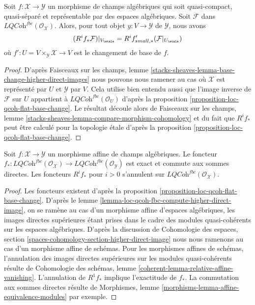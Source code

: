 \begin{lemma}
\label{lemma-loc-qcoh-fbc-compute-higher-direct-image}
Soit $f : \mathcal{X} \to \mathcal{Y}$ un morphisme de champs algébriques
qui soit quasi-compact, quasi-séparé et
représentable par des espaces algébriques. Soit $\mathcal{F}$ dans
$\textit{LQCoh}^{fbc}(\mathcal{O}_\mathcal{X})$.
Alors, pour tout objet $y : V \to \mathcal{Y}$ de $\mathcal{Y}$, nous avons
$$
(R^if_*\mathcal{F})|_{V_\etale} = R^if'_{small, *}(\mathcal{F}|_{U_\etale})
$$
où $f' : U = V \times_\mathcal{Y} \mathcal{X} \to V$ est le changement
de base de $f$.
\end{lemma}

\begin{proof}
D'après Faisceaux sur les champs, lemme
\ref{stacks-sheaves-lemma-base-change-higher-direct-images}
nous pouvons nous ramener au cas où $\mathcal{X}$
est représenté par $U$ et $\mathcal{Y}$
par $V$. Cela utilise bien entendu aussi que l'image inverse de
$\mathcal{F}$ sur $U$ appartient à $\textit{LQCoh}^{fbc}(\mathcal{O}_U)$
d'après la proposition \ref{proposition-loc-qcoh-flat-base-change}.
Le résultat découle alors de
Faisceaux sur les champs, lemme
\ref{stacks-sheaves-lemma-compare-morphism-cohomology}
et du fait que $R^if_*$ peut être calculé pour la
topologie étale d'après la
proposition \ref{proposition-loc-qcoh-flat-base-change}.
\end{proof}

\begin{lemma}
\label{lemma-loc-qcoh-fbc-affine-direct-image}
Soit $f : \mathcal{X} \to \mathcal{Y}$ un morphisme affine de champs
algébriques. Le foncteur $f_* : \textit{LQCoh}^{fbc}(\mathcal{O}_\mathcal{X}) \to
\textit{LQCoh}^{fbc}(\mathcal{O}_\mathcal{Y})$ est exact et commute
aux sommes directes. Les foncteurs $R^if_*$ pour $i > 0$ s'annulent sur
$\textit{LQCoh}^{fbc}(\mathcal{O}_\mathcal{X})$.
\end{lemma}

\begin{proof}
Les foncteurs existent d'après la proposition \ref{proposition-loc-qcoh-flat-base-change}.
D'après le lemme \ref{lemma-loc-qcoh-fbc-compute-higher-direct-image},
on se ramène au cas d'un morphisme affine d'espaces algébriques,
les images directes supérieures étant prises dans le cadre des modules
quasi-cohérents sur les espaces algébriques. D'après la discussion de
Cohomologie des espaces, section
\ref{spaces-cohomology-section-higher-direct-image}
nous nous ramenons au cas d'un morphisme affine de schémas.
Pour les morphismes affines de schémas, l'annulation des
images directes supérieures sur les modules quasi-cohérents résulte de
Cohomologie des schémas, lemme \ref{coherent-lemma-relative-affine-vanishing}.
L'annulation de $R^1f_*$ implique l'exactitude de $f_*$.
La commutation aux sommes directes résulte de
Morphismes, lemme \ref{morphisms-lemma-affine-equivalence-modules}
par exemple.
\end{proof}










